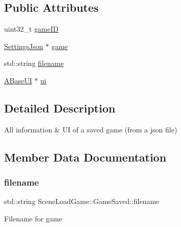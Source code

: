 \subsection*{Public Attributes}
\begin{DoxyCompactItemize}
\item 
uint32\+\_\+t \hyperlink{struct_scene_load_game_1_1_game_saved_ae8ad0057c09060413b282e4d111fcc4c}{game\+ID}
\item 
\hyperlink{class_settings_json}{Settings\+Json} $\ast$ \hyperlink{struct_scene_load_game_1_1_game_saved_a54dfde52a1ed25a1c313f57a4e62125d}{game}
\item 
std\+::string \hyperlink{struct_scene_load_game_1_1_game_saved_a7b92026b74f7d52089a2d3cc49dae61f}{filename}
\item 
\hyperlink{class_a_base_u_i}{A\+Base\+UI} $\ast$ \hyperlink{struct_scene_load_game_1_1_game_saved_aa837cefcef8df2d154023aceddf7d3a3}{ui}
\end{DoxyCompactItemize}


\subsection{Detailed Description}
All information \& UI of a saved game (from a json file) 

\subsection{Member Data Documentation}
\mbox{\label{struct_scene_load_game_1_1_game_saved_a7b92026b74f7d52089a2d3cc49dae61f}} 
\subsubsection{\texorpdfstring{filename}{filename}}
{\footnotesize\ttfamily std\+::string Scene\+Load\+Game\+::\+Game\+Saved\+::filename}

Filename for game \mbox{\label{struct_scene_load_game_1_1_game_saved_a54dfde52a1ed25a1c313f57a4e62125d}} 
